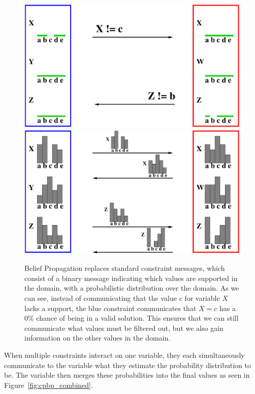 \documentclass[../Document.tex]{subfiles}
\begin{document}
\begin{figure}[ht]
    \centering
    \includegraphics[scale=0.35]{images/CP-BP-0.pdf}
    \includegraphics[scale=0.35]{images/CP-BP-2.pdf}
    \caption[\acrlong{cpbp} messaging.]{Belief Propagation replaces standard constraint messages, which consist of a binary message indicating which values are supported in the domain, with a probabilistic distribution over the domain. As we can see, instead of communicating that the value $c$ for variable $X$ lacks a support, the blue constraint communicates that $X=c$ has a $0\%$ chance of being in a valid solution. This ensures that we can still communicate what values must be filtered out, but we also gain information on the other values in the domain.}
    \label{fig:cpbp_messaging}
\end{figure}

When multiple constraints interact on one variable, they each simultaneously communicate to the variable what they estimate the probability distribution to be. The variable then merges these probabilities into the final values as seen in Figure~\ref{fig:cpbp_combined}.
\end{document}
